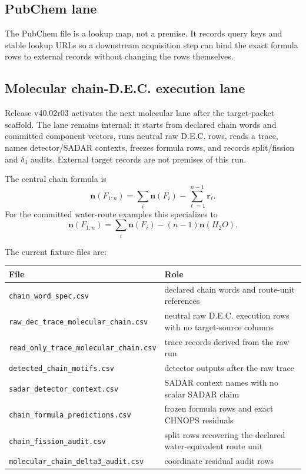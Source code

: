 
\subsection{PubChem lane}

The PubChem file is a lookup map, not a premise. It records query keys and stable lookup URLs so a downstream acquisition step can bind the exact formula rows to external records without changing the rows themselves.


\subsection{Molecular chain-D.E.C. execution lane}

Release v40.02r03 activates the next molecular lane after the target-packet scaffold. The lane remains internal: it starts from declared chain words and committed component vectors, runs neutral raw D.E.C. rows, reads a trace, names detector/SADAR contexts, freezes formula rows, and records split/fission and $\delta_3$ audits. External target records are not premises of this run.

The central chain formula is
\[
\mathbf n(F_{1:n})=\sum_i \mathbf n(F_i)-\sum_{\ell=1}^{n-1}\mathbf r_\ell.
\]
For the committed water-route examples this specializes to
\[
\mathbf n(F_{1:n})=\sum_i \mathbf n(F_i)-(n-1)\mathbf n(H_2O).
\]

The current fixture files are:
\begin{center}
\begin{tabularx}{\linewidth}{@{}lX@{}}
\toprule
File & Role \\
\midrule
\texttt{chain\_word\_spec.csv} & declared chain words and route-unit references \\
\texttt{raw\_dec\_trace\_molecular\_chain.csv} & neutral raw D.E.C. execution rows with no target-source columns \\
\texttt{read\_only\_trace\_molecular\_chain.csv} & trace records derived from the raw run \\
\texttt{detected\_chain\_motifs.csv} & detector outputs after the raw trace \\
\texttt{sadar\_detector\_context.csv} & SADAR context names with no scalar SADAR claim \\
\texttt{chain\_formula\_predictions.csv} & frozen formula rows and exact CHNOPS residuals \\
\texttt{chain\_fission\_audit.csv} & split rows recovering the declared water-equivalent route unit \\
\texttt{molecular\_chain\_delta3\_audit.csv} & coordinate residual audit rows \\
\bottomrule
\end{tabularx}
\end{center}

